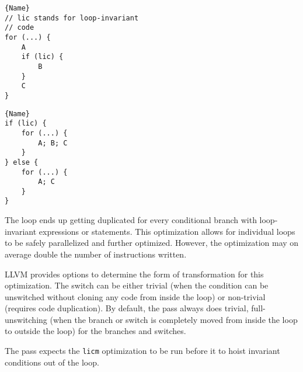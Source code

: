 \documentclass{article}
\begin{document}
\noindent\begin{minipage}{.45\textwidth}
    \begin{lstlisting}[caption=Before Unswitching,style=customC++]{Name}
// lic stands for loop-invariant
// code
for (...) {
    A
    if (lic) {
        B
    }
    C
}
    \end{lstlisting}
\end{minipage}\hfill
\begin{minipage}{.45\textwidth}
    \begin{lstlisting}[caption=After Unswitching,style=customC++,firstnumber=1]{Name}
if (lic) {
    for (...) {
        A; B; C
    }
} else {
    for (...) {
        A; C
    }
}
    \end{lstlisting}
\end{minipage}

The loop ends up getting duplicated for every conditional branch with loop-invariant expressions or statements. This optimization allows for individual loops to be safely parallelized and further optimized. However, the optimization may on average double the number of instructions written. \cite{loop-unswitch}

LLVM provides options to determine the form of transformation for this optimization. The switch can be either trivial (when the condition can be unswitched without cloning any code from inside the loop) or non-trivial (requires code duplication). By default, the pass always does trivial, full-unswitching (when the branch or switch is completely moved from inside the loop to outside the loop) for the branches and switches. \cite{loop-unswitch-src}

The pass expects the \texttt{licm} optimization to be run before it to hoist invariant conditions out of the loop.



\end{document}

